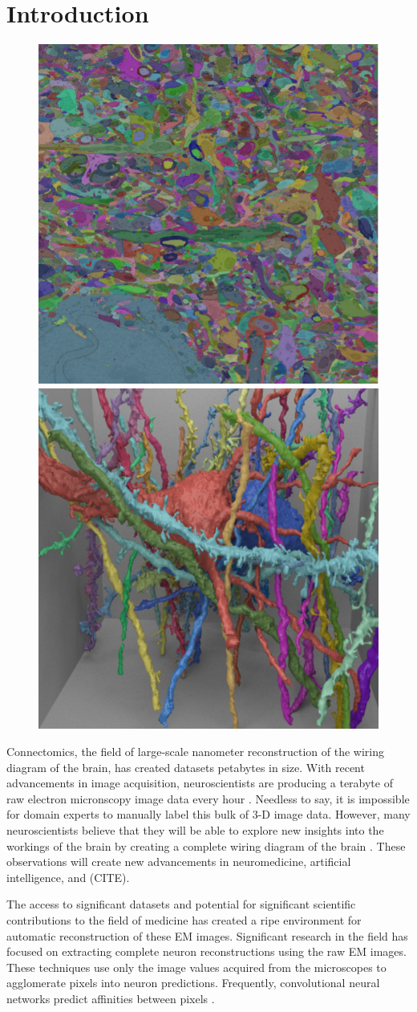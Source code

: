 \section{Introduction}

\begin{figure}
	\centering
	\includegraphics[width=0.42\linewidth]{./figures/intro-slice.png}
	\hspace{0.085\linewidth}
	\includegraphics[width=0.42\linewidth]{./figures/intro-cube.png}
\end{figure}

Connectomics, the field of large-scale nanometer reconstruction of the wiring diagram of the brain, has created datasets petabytes in size. With recent advancements in image acquisition, neuroscientists are producing a terabyte of raw electron micronscopy image data every hour \cite{hildebrand2017whole}. Needless to say, it is impossible for domain experts to manually label this bulk of 3-D image data. However, many neuroscientists believe that they will be able to explore new insights into the workings of the brain by creating a complete wiring diagram of the brain \cite{kasthuri2015saturated}. These observations will create new advancements in neuromedicine, artificial intelligence, and (CITE). 

The access to significant datasets and potential for significant scientific contributions to the field of medicine has created a ripe environment for automatic reconstruction of these EM images. Significant research in the field has focused on extracting complete neuron reconstructions using the raw EM images. These techniques use only the image values acquired from the microscopes to agglomerate pixels into neuron predictions. Frequently, convolutional neural networks predict affinities between pixels \cite{ronneberger2015u,lee2015recursive}. 


